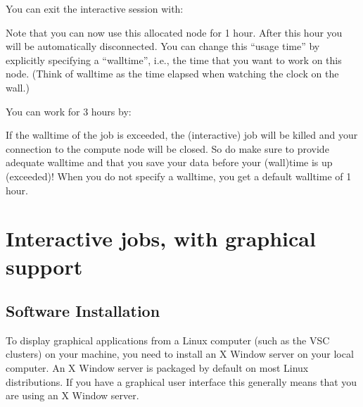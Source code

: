 
You can exit the interactive session with:

\begin{prompt}
\end{prompt}

Note that you can now use this allocated node for 1 hour.  After this hour you
will be automatically disconnected. You can change this ``usage time'' by
explicitly specifying a ``walltime'', i.e., the time that you want to work on
this node.  (Think of walltime as the time elapsed when watching the clock on
the wall.)

You can work for 3 hours by:

\begin{prompt}
\end{prompt}

If the walltime of the job is exceeded, the (interactive) job will be killed
and your connection to the compute node will be closed. So do make sure to
provide adequate walltime and that you save your data before your (wall)time is
up (exceeded)!  When you do not specify a walltime, you get a default walltime
of 1 hour.

\section{Interactive jobs, with graphical support}

\subsection{Software Installation}

To display graphical applications from a Linux computer (such as the VSC
clusters) on your machine, you need to install an X Window server on your
local computer.
\iflinux
An X Window server is packaged by default on most Linux distributions. If you
have a graphical user interface this generally means that you are using an
X Window server.
\fi

